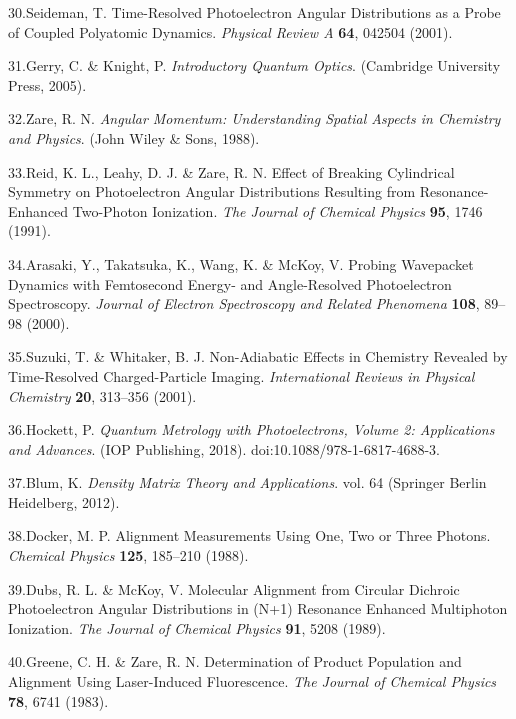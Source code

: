 \documentclass[10pt]{article}
\begin{document}
\label{csl:30}30.Seideman, T. {Time-Resolved Photoelectron Angular Distributions as a Probe of Coupled Polyatomic Dynamics}. \textit{Physical Review A} \textbf{64}, 042504 (2001).

\label{csl:31}31.Gerry, C. \& Knight, P. \textit{{Introductory {{Quantum Optics}}}}. ({Cambridge University Press}, 2005).

\label{csl:32}32.Zare, R. N. \textit{{Angular {{Momentum}}: {{Understanding}} Spatial Aspects in Chemistry and Physics}}. ({John Wiley \& Sons}, 1988).

\label{csl:33}33.Reid, K. L., Leahy, D. J. \& Zare, R. N. {Effect of Breaking Cylindrical Symmetry on Photoelectron Angular Distributions Resulting from Resonance-Enhanced Two-Photon Ionization}. \textit{The Journal of Chemical Physics} \textbf{95}, 1746 (1991).

\label{csl:34}34.Arasaki, Y., Takatsuka, K., Wang, K. \& McKoy, V. {Probing Wavepacket Dynamics with Femtosecond Energy- and Angle-Resolved Photoelectron Spectroscopy}. \textit{Journal of Electron Spectroscopy and Related Phenomena} \textbf{108}, 89–98 (2000).

\label{csl:35}35.Suzuki, T. \& Whitaker, B. J. {Non-Adiabatic Effects in Chemistry Revealed by Time-Resolved Charged-Particle Imaging}. \textit{International Reviews in Physical Chemistry} \textbf{20}, 313–356 (2001).

\label{csl:36}36.Hockett, P. \textit{{Quantum {{Metrology}} with {{Photoelectrons}}, {{Volume}} 2: {{Applications}} and Advances}}. ({IOP Publishing}, 2018). doi:10.1088/978-1-6817-4688-3.

\label{csl:37}37.Blum, K. \textit{{Density {{Matrix Theory}} and {{Applications}}}}. vol. 64 ({Springer Berlin Heidelberg}, 2012).

\label{csl:38}38.Docker, M. P. {Alignment Measurements Using One, Two or Three Photons}. \textit{Chemical Physics} \textbf{125}, 185–210 (1988).

\label{csl:39}39.Dubs, R. L. \& McKoy, V. {Molecular Alignment from Circular Dichroic Photoelectron Angular Distributions in (N+1) Resonance Enhanced Multiphoton Ionization}. \textit{The Journal of Chemical Physics} \textbf{91}, 5208 (1989).

\label{csl:40}40.Greene, C. H. \& Zare, R. N. {Determination of Product Population and Alignment Using Laser-Induced Fluorescence}. \textit{The Journal of Chemical Physics} \textbf{78}, 6741 (1983).
\end{document}
